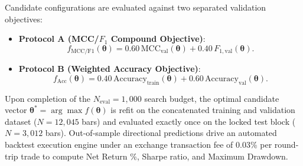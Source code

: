 Candidate configurations are evaluated against two separated validation objectives:
\begin{itemize}
    \item \textbf{Protocol A (MCC/$F_1$ Compound Objective)}:
    \begin{equation}\label{eq:fitness_protocol_a}
    f_{\mathrm{MCC/F1}}(\boldsymbol{\theta}) = 0.60\,\mathrm{MCC}_{\mathrm{val}}(\boldsymbol{\theta}) + 0.40\,F_{1,\mathrm{val}}(\boldsymbol{\theta}).
    \end{equation}
    \item \textbf{Protocol B (Weighted Accuracy Objective)}:
    \begin{equation}\label{eq:fitness_protocol_b}
    f_{\mathrm{Acc}}(\boldsymbol{\theta}) = 0.40\,\mathrm{Accuracy}_{\mathrm{train}}(\boldsymbol{\theta}) + 0.60\,\mathrm{Accuracy}_{\mathrm{val}}(\boldsymbol{\theta}).
    \end{equation}
\end{itemize}

Upon completion of the $N_{\mathrm{eval}} = 1{,}000$ search budget, the optimal candidate vector $\boldsymbol{\theta}^* = \arg\max f(\boldsymbol{\theta})$ is refit on the concatenated training and validation dataset ($N = 12{,}045$ bars) and evaluated exactly once on the locked test block ($N = 3{,}012$ bars). Out-of-sample directional predictions drive an automated backtest execution engine under an exchange transaction fee of 0.03\% per round-trip trade to compute Net Return \%, Sharpe ratio, and Maximum Drawdown.
